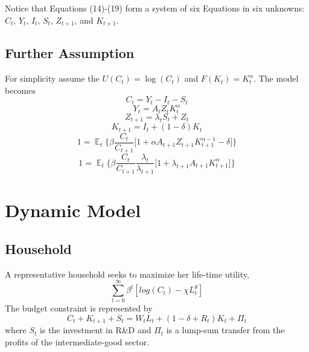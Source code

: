 \documentclass{article}
\DeclareMathOperator{\E}{\mathbb{E}}
\begin{document}
	
	Notice that Equations (14)-(19) form a system of six Equations in six unknowns: $C_t$, $Y_t$, $I_t$, $S_t$, $Z_{t+1}$, and $K_{t+1}$.
	
	\subsection*{Further Assumption}
	
	For simplicity assume the $U(C_t) = \log(C_t)$ and $F(K_t) = K_t^{\alpha}$. The model becomes
	\begin{equation}
	C_t = Y_t - I_t - S_t
	\end{equation}
	\begin{equation}
	Y_t = A_t Z_t K_t^{\alpha}
	\end{equation}
	\begin{equation}
	Z_{t+1} = \lambda_t S_t + Z_t
	\end{equation}
	\begin{equation}
	K_{t+1} = I_t + (1 - \delta)K_t
	\end{equation}
	\begin{equation}
	1 = \E_t \Bigg\{ \beta \frac{C_t}{C_{t+1}} \big[   1  + \alpha A_{t+1} Z_{t+1} K_{t+1}^{\alpha - 1} - \delta \big]   \Bigg\}
	\end{equation}
	\begin{equation}
	1 = \E_t \Bigg\{ \beta \frac{C_t}{C_{t+1}} \frac{\lambda_t}{\lambda_{t+1}} \big[ 1 + \lambda_{t+1}  A_{t+1} K_{t+1}^{\alpha} \big]   \Bigg\}
	\end{equation}
	
\section{Dynamic Model}

\subsection{Household}

A representative household seeks to maximize her life-time utility,
\begin{equation}
\sum_{t=0}^{\infty} \beta^t [ log(C_t) - \chi L_t^{\theta}]
\end{equation}
The budget constraint is represented by
\begin{equation}
C_t + K_{t+1} + S_t = W_tL_t + (1- \delta + R_{t})K_t + \Pi_t
\end{equation}
where $S_t$ is the investment in R\&D and $\Pi_t$ is a lump-sum transfer from the profits of the intermediate-good sector.
\end{document}
